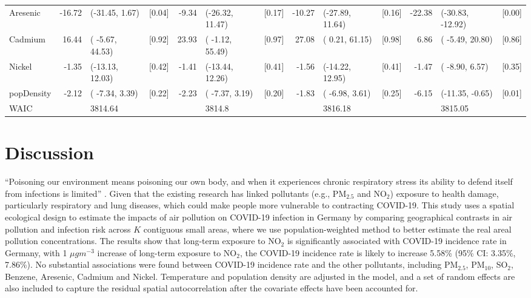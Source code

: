 \documentclass[12,]{article}
\begin{document}
\begin{landscape}
\begin{table}
\begin{tabular}[t]{lrlcrlcrlcrlc}
Aresenic & -16.72 & (-31.45,   1.67) & [0.04] & -9.34 & (-26.32,  11.47) & [0.17] & -10.27 & (-27.89,  11.64) & [0.16] & -22.38 & (-30.83, -12.92) & [0.00]\\
Cadmium & 16.44 & ( -5.67,  44.53) & [0.92] & 23.93 & ( -1.12,  55.49) & [0.97] & 27.08 & (  0.21,  61.15) & [0.98] & 6.86 & ( -5.49,  20.80) & [0.86]\\
Nickel & -1.35 & (-13.13,  12.03) & [0.42] & -1.41 & (-13.44,  12.26) & [0.41] & -1.56 & (-14.22,  12.95) & [0.41] & -1.47 & ( -8.90,   6.57) & [0.35]\\
popDensity & -2.12 & ( -7.34,   3.39) & [0.22] & -2.23 & ( -7.37,   3.19) & [0.20] & -1.83 & ( -6.98,   3.61) & [0.25] & -6.15 & (-11.35,  -0.65) & [0.01]\\
WAIC &  & 3814.64 &  &  & 3814.8 &  &  & 3816.18 &  &  & 3815.05 & \\
\bottomrule
\end{tabular}
\end{table}
\end{landscape}
\restoregeometry

\hypertarget{sec:conclusion}{%
\section{Discussion}\label{sec:conclusion}}

``Poisoning our environment means poisoning our own body, and when it
experiences chronic respiratory stress its ability to defend itself from
infections is limited'' \autocite{Ogen2020}. Given that the existing
research has linked pollutants (e.g., PM\(_{2.5}\) and NO\(_2\))
exposure to health damage, particularly respiratory and lung diseases,
which could make people more vulnerable to contracting COVID-19. This
study uses a spatial ecological design to estimate the impacts of air
pollution on COVID-19 infection in Germany by comparing geographical
contrasts in air pollution and infection risk across \(K\) contiguous
small areas, where we use population-weighted method to better estimate
the real areal pollution concentrations. The results show that long-term
exposure to NO\(_2\) is significantly associated with COVID-19 incidence
rate in Germany, with 1 \(\mu gm^{-3}\) increase of long-term exposure
to NO\(_2\), the COVID-19 incidence rate is likely to increase 5.58\%
(95\% CI: 3.35\%, 7.86\%). No substantial associations were found
between COVID-19 incidence rate and the other pollutants, including
PM\(_{2.5}\), PM\(_{10}\), SO\(_2\), Benzene, Aresenic, Cadmium and
Nickel. Temperature and population density are adjusted in the model,
and a set of random effects are also included to capture the residual
spatial autocorrelation after the covariate effects have been accounted
for.
\end{document}
